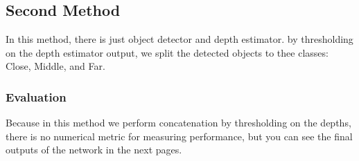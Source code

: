 \documentclass[a4paper, openany]{book}
\begin{document}
\subsection{Second Method}
	\vspace{0.3cm}

In this method, there is just object detector and depth estimator. by thresholding on the depth estimator output, we split the detected objects to thee classes: Close, Middle, and Far.

\subsubsection{Evaluation}
	\vspace{0.3cm}

Because in this method we perform concatenation by thresholding on the depths, there is no numerical metric for measuring performance, but you can see the final outputs of the network in the next pages.
\end{document}
